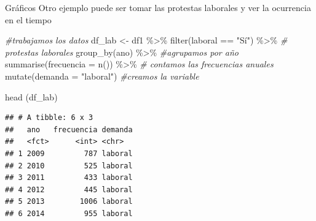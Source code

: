 \documentclass[
  8pt,
  ignorenonframetext,
]{beamer}
\newenvironment{Shaded}{\begin{snugshade}}{\end{snugshade}}
\newcommand{\AttributeTok}[1]{\textcolor[rgb]{0.77,0.63,0.00}{#1}}
\newcommand{\CommentTok}[1]{\textcolor[rgb]{0.56,0.35,0.01}{\textit{#1}}}
\newcommand{\FunctionTok}[1]{\textcolor[rgb]{0.00,0.00,0.00}{#1}}
\newcommand{\NormalTok}[1]{#1}
\newcommand{\OtherTok}[1]{\textcolor[rgb]{0.56,0.35,0.01}{#1}}
\newcommand{\SpecialCharTok}[1]{\textcolor[rgb]{0.00,0.00,0.00}{#1}}
\newcommand{\StringTok}[1]{\textcolor[rgb]{0.31,0.60,0.02}{#1}}
\begin{document}
\begin{frame}[fragile]{Gráficos}
\protect\hypertarget{gruxe1ficos-3}{}
Otro ejemplo puede ser tomar las protestas laborales y ver la ocurrencia
en el tiempo

\begin{Shaded}
\begin{Highlighting}[]
\CommentTok{\#trabajamos los datos}
\NormalTok{df\_lab }\OtherTok{\textless{}{-}}\NormalTok{ df1 }\SpecialCharTok{\%\textgreater{}\%} \FunctionTok{filter}\NormalTok{(laboral }\SpecialCharTok{==} \StringTok{"Sí"}\NormalTok{) }\SpecialCharTok{\%\textgreater{}\%} \CommentTok{\# protestas laborales}
  \FunctionTok{group\_by}\NormalTok{(ano) }\SpecialCharTok{\%\textgreater{}\%} \CommentTok{\#agrupamos por año}
   \FunctionTok{summarise}\NormalTok{(}\AttributeTok{frecuencia =} \FunctionTok{n}\NormalTok{()) }\SpecialCharTok{\%\textgreater{}\%} \CommentTok{\# contamos las frecuencias anuales}
  \FunctionTok{mutate}\NormalTok{(}\AttributeTok{demanda =} \StringTok{"laboral"}\NormalTok{) }\CommentTok{\#creamos la variable }

\FunctionTok{head}\NormalTok{ (df\_lab)}
\end{Highlighting}
\end{Shaded}

\begin{verbatim}
## # A tibble: 6 x 3
##   ano   frecuencia demanda
##   <fct>      <int> <chr>  
## 1 2009         787 laboral
## 2 2010         525 laboral
## 3 2011         433 laboral
## 4 2012         445 laboral
## 5 2013        1006 laboral
## 6 2014         955 laboral
\end{verbatim}
\end{frame}
\end{document}
